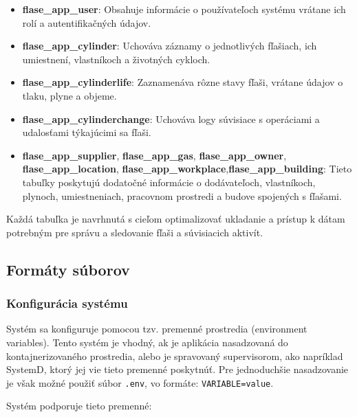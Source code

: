 \documentclass{zah}
\begin{document}
\begin{itemize}
    \item \textbf{flase\_app\_user}: Obsahuje informácie o používateľoch systému vrátane ich rolí a autentifikačných údajov.
    \item \textbf{flase\_app\_cylinder}: Uchováva záznamy o jednotlivých fľašiach, ich umiestnení, vlastníkoch a životných cykloch.
    \item \textbf{flase\_app\_cylinderlife}: Zaznamenáva rôzne stavy fľaši, vrátane údajov o tlaku, plyne a objeme.
    \item \textbf{flase\_app\_cylinderchange}: Uchováva logy súvisiace s operáciami a udalosťami týkajúcimi sa fľaši.
    \item \textbf{flase\_app\_supplier}, \textbf{flase\_app\_gas}, \textbf{flase\_app\_owner}, \textbf{flase\_app\_location}, \textbf{flase\_app\_workplace},\textbf{flase\_app\_building}: Tieto tabuľky poskytujú dodatočné informácie o dodávateľoch, vlastníkoch, plynoch, umiestneniach, pracovnom prostredi a budove spojených s fľašami.
\end{itemize}

Každá tabuľka je navrhnutá s cieľom optimalizovať ukladanie a prístup k dátam potrebným pre správu a sledovanie fľaši a súvisiacich aktivít.

\subsection{Formáty súborov}
\subsubsection{Konfigurácia systému}

Systém sa konfiguruje pomocou tzv. premenné prostredia (environment variables).
Tento systém je vhodný, ak je aplikácia nasadzovaná do kontajnerizovaného prostredia,
alebo je spravovaný supervisorom, ako napríklad SystemD, ktorý jej vie tieto premenné poskytnúť.
Pre jednoduchšie nasadzovanie je však možné použiť súbor \texttt{.env}, vo formáte: \texttt{VARIABLE=value}.

Systém podporuje tieto premenné:
\end{document}
